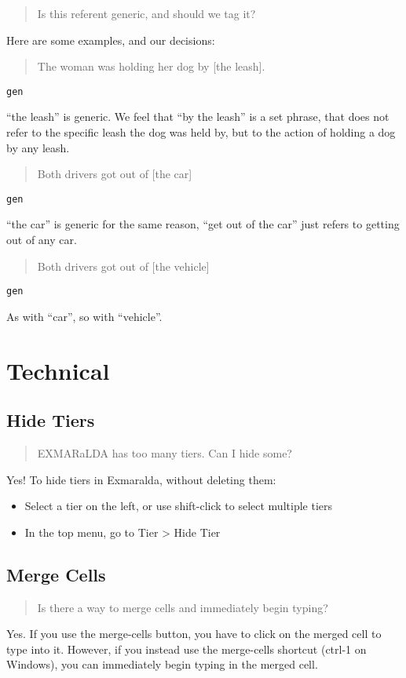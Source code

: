 \documentclass[
]{book}
\providecommand{\tightlist}{%
  \setlength{\itemsep}{0pt}\setlength{\parskip}{0pt}}
\begin{document}
\begin{quote}
Is this referent generic, and should we tag it?
\end{quote}

Here are some examples, and our decisions:

\begin{quote}
The woman was holding her dog by {[}the leash{]}.
\end{quote}

\texttt{gen}

``the leash'' is generic.
We feel that ``by the leash'' is a set phrase,
that does not refer to the specific leash the dog was held by,
but to the action of holding a dog by any leash.

\begin{quote}
Both drivers got out of {[}the car{]}
\end{quote}

\texttt{gen}

``the car'' is generic for the same reason,
``get out of the car'' just refers to getting out of any car.

\begin{quote}
Both drivers got out of {[}the vehicle{]}
\end{quote}

\texttt{gen}

As with ``car'', so with ``vehicle''.

\hypertarget{technical}{%
\section{Technical}\label{technical}}

\hypertarget{hide-tiers}{%
\subsection{Hide Tiers}\label{hide-tiers}}

\begin{quote}
EXMARaLDA has too many tiers. Can I hide some?
\end{quote}

Yes! To hide tiers in Exmaralda, without deleting them:

\begin{itemize}
\tightlist
\item
  Select a tier on the left, or use shift-click to select multiple tiers
\item
  In the top menu, go to Tier \textgreater{} Hide Tier
\end{itemize}

\hypertarget{merge-cells}{%
\subsection{Merge Cells}\label{merge-cells}}

\begin{quote}
Is there a way to merge cells and immediately begin typing?
\end{quote}

Yes.
If you use the merge-cells button, you have to click on the merged cell to type into it.
However, if you instead use the merge-cells shortcut (ctrl-1 on Windows), you can immediately begin typing in the merged cell.
\end{document}
